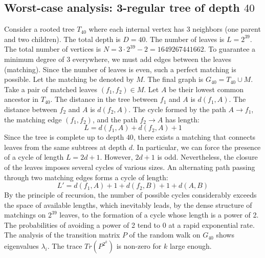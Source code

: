 \documentclass[11pt,a4paper]{article}
\begin{document}
\subsection{Worst-case analysis: 3-regular tree of depth $40$}
Consider a rooted tree $T_{40}$ where each internal vertex has 3 neighbors (one parent and two children).
The total depth is $D = 40$.
The number of leaves is $L = 2^{39}$.
The total number of vertices is $N = 3 \cdot 2^{39} - 2 = 1649267441662$.
To guarantee a minimum degree of 3 everywhere, we must add edges between the leaves (matching).
Since the number of leaves is even, such a perfect matching is possible.
Let the matching be denoted by $M$. The final graph is $G_{40} = T_{40} \cup M$.
Take a pair of matched leaves $(f_1, f_2) \in M$.
Let $A$ be their lowest common ancestor in $T_{40}$.
The distance in the tree between $f_1$ and $A$ is $d(f_1, A)$.
The distance between $f_2$ and $A$ is $d(f_2, A)$.
The cycle formed by the path $A \to f_1$, the matching edge $(f_1, f_2)$, and the path $f_2 \to A$ has length:
$$ L = d(f_1, A) + d(f_2, A) + 1 $$
Since the tree is complete up to depth $40$, there exists a matching that connects leaves from the same subtrees at depth $d$.
In particular, we can force the presence of a cycle of length $L = 2d + 1$. However, $2d+1$ is odd.
Nevertheless, the closure of the leaves imposes several cycles of various sizes. An alternating path passing through two matching edges forms a cycle of length:
$$ L' = d(f_1, A) + 1 + d(f_2, B) + 1 + d(A, B) $$
By the principle of recursion, the number of possible cycles considerably exceeds the space of available lengths, which inevitably leads, by the dense structure of matchings on $2^{39}$ leaves, to the formation of a cycle whose length is a power of 2. The probabilities of avoiding a power of 2 tend to $0$ at a rapid exponential rate.
The analysis of the transition matrix $P$ of the random walk on $G_{40}$ shows eigenvalues $\lambda_i$. The trace $Tr(P^{2^k})$ is non-zero for $k$ large enough.
\end{document}
